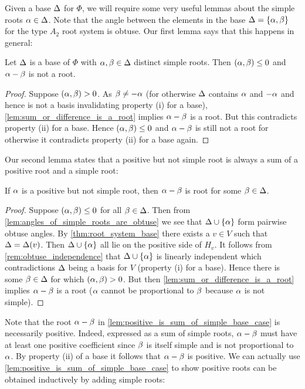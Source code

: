 \documentclass[12pt,reqno,oneside]{amsart}
\begin{document}
    Given a base $\Delta$ for $\Phi$, we will require some very useful lemmas about the simple roots $\alpha \in \Delta$. Note that the angle between the elements in the base $\Delta = \{\alpha,\beta\}$ for the type $A_{2}$ root system is obtuse. Our first lemma says that this happens in general:

    \begin{lemma}\label{lem:angles_of_simple_roots_are_obtuse}
        Let $\Delta$ is a base of $\Phi$ with $\alpha,\beta \in \Delta$ distinct simple roots. Then $(\alpha,\beta) \le 0$ and $\alpha-\beta$ is not a root.
    \end{lemma}
    \begin{proof}
        Suppose $(\alpha,\beta) > 0$. As $\beta \neq -\alpha$ (for otherwise $\Delta$ contains $\alpha$ and $-\alpha$ and hence is not a basis invalidating property (i) for a base), \cref{lem:sum_or_difference_is_a_root} implies $\alpha-\beta$ is a root. But this contradicts property (ii) for a base. Hence $(\alpha,\beta) \le 0$ and $\alpha-\beta$ is still not a root for otherwise it contradicts property (ii) for a base again.
    \end{proof}

    Our second lemma states that a positive but not simple root is always a sum of a positive root and a simple root:

    \begin{lemma}\label{lem:positive_is_sum_of_simple_base_case}
        If $\alpha$ is a positive but not simple root, then $\alpha-\beta$ is root for some $\beta \in \Delta$.
    \end{lemma}
    \begin{proof}
        Suppose $(\alpha,\beta) \le 0$ for all $\beta \in \Delta$. Then from \cref{lem:angles_of_simple_roots_are_obtuse} we see that $\Delta \cup \{\alpha\}$ form pairwise obtuse angles. By \cref{thm:root_system_base} there exists a $v \in V$ such that $\Delta = \Delta(v)$. Then $\Delta \cup \{\alpha\}$ all lie on the positive side of $H_{v}$. It follows from \cref{rem:obtuse_independence} that $\Delta \cup \{\alpha\}$ is linearly independent which contradictions $\Delta$ being a basis for $V$ (property (i) for a base). Hence there is some $\beta \in \Delta$ for which $(\alpha,\beta) > 0$. But then \cref{lem:sum_or_difference_is_a_root} implies $\alpha-\beta$ is a root ($\alpha$ cannot be proportional to $\beta$ because $\alpha$ is not simple).
    \end{proof}

    Note that the root $\alpha-\beta$ in \cref{lem:positive_is_sum_of_simple_base_case} is necessarily positive. Indeed, expressed as a sum of simple roots, $\alpha-\beta$ must have at least one positive coefficient since $\beta$ is itself simple and is not proportional to $\alpha$. By property (ii) of a base it follows that $\alpha-\beta$ is positive. We can actually use \cref{lem:positive_is_sum_of_simple_base_case} to show positive roots can be obtained inductively by adding simple roots:
\end{document}

